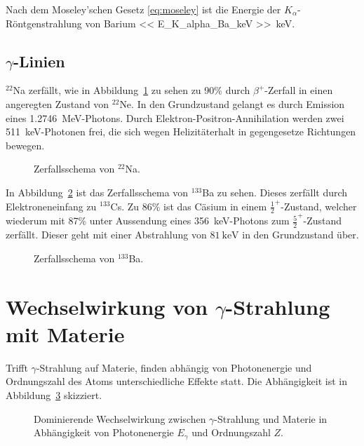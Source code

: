 Nach dem Moseley'schen Gesetz \eqref{eq:moseley} ist die Energie der
$K_\alpha$-Röntgenstrahlung von Barium \SI{<< E_K_alpha_Ba_keV
>>}{\kilo\electronvolt}.

\subsection{$\gamma$-Linien}

${}^{22}$Na zerfällt, wie in Abbildung~\ref{fig:Na-Zerfall} zu sehen zu 90\%
durch $\beta^+$-Zerfall in einen angeregten Zustand von ${}^{22}$Ne. In den
Grundzustand gelangt es durch Emission eines
\SI{1.2746}{\mega\electronvolt}-Photons. Durch Elektron-Positron-Annihilation
werden zwei \SI{511}{\kilo\electronvolt}-Photonen frei, die sich wegen
Helizitäterhalt in gegengesetze Richtungen bewegen.

\begin{figure}[htbp]
    \centering
    \caption{%
        Zerfallsschema von ${}^{22}$Na.
    }
    \label{fig:Na-Zerfall}
\end{figure}

In Abbildung~\ref{fig:Ba-Zerfall} ist das Zerfallsschema von ${}^{133}$Ba zu
sehen. Dieses zerfällt durch Elektroneneinfang zu ${}^{133}$Cs. Zu 86\% ist das
Cäsium in einem $\frac{1}{2}^+$-Zustand, welcher wiederum mit 87\% unter
Aussendung eines \SI{356}{\kilo\electronvolt}-Photons zum
$\frac{5}{2}^+$-Zustand zerfällt. Dieser geht mit einer Abstrahlung von
$\SI{81}{\kilo\electronvolt}$ in den Grundzustand über.

\begin{figure}[htbp]
    \centering
    \caption{%
        Zerfallsschema von ${}^{133}$Ba.
    }
    \label{fig:Ba-Zerfall}
\end{figure}

\section{Wechselwirkung von $\gamma$-Strahlung mit Materie}

Trifft $\gamma$-Strahlung auf Materie, finden abhängig von Photonenergie und
Ordnungszahl des Atoms unterschiedliche Effekte statt. Die Abhängigkeit ist in
Abbildung~\ref{fig:wechselwirkung} skizziert.
\begin{figure}
    \centering
    \caption{%
        Dominierende Wechselwirkung zwischen $\gamma$-Strahlung und Materie in
        Abhängigkeit von Photonenergie $E_\gamma$ und Ordnungszahl
        $Z$.%
    }
    \label{fig:wechselwirkung}
\end{figure}

